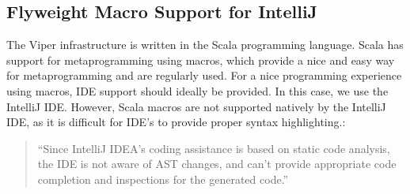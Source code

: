 \documentclass[11pt]{article}
\begin{document}






    \subsection{Flyweight Macro Support for IntelliJ}

    The Viper infrastructure is written in the Scala programming language.
    Scala has support for metaprogramming using macros, which provide
    a nice and easy way for metaprogramming and
    are regularly used. For a nice programming experience
    using macros, IDE support should ideally be provided. In this case, we use the IntelliJ IDE.
    However, Scala macros are not supported natively by the IntelliJ IDE, 
    as it is difficult for IDE's to provide proper syntax highlighting.:

    \begin{quote}
        ``Since IntelliJ IDEA’s coding assistance is based on static code analysis,
        the IDE is not aware of AST changes, and can’t provide appropriate code
        completion and inspections for the generated code.'' \cite{intellij}
    \end{quote}
\end{document}
